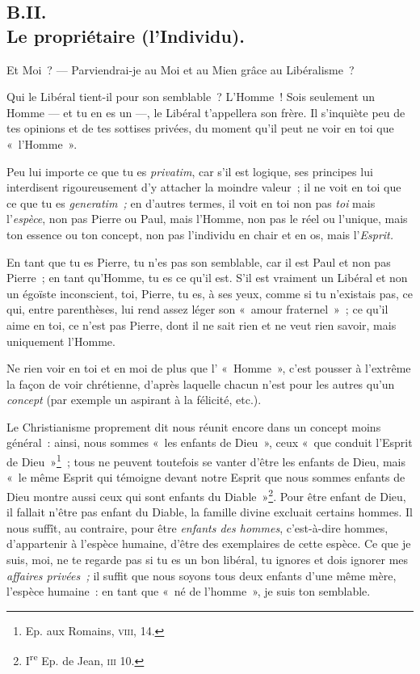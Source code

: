 \documentclass[french,twoside]{book} %
\begin{document}
 \subsection[{B.II. Le propriétaire (l’Individu).}]{B.II. \\
Le propriétaire (l’Individu).}
\noindent Et Moi ? — Parviendrai-je au Moi et au Mien grâce au Libéralisme ?\par
Qui le Libéral tient-il pour son semblable ? L’Homme ! Sois seulement un Homme — et tu en es un —, le Libéral t’appellera son frère. Il s’inquiète peu de tes opinions et de tes sottises privées, du moment qu’il peut ne voir en toi que « l’Homme ».\par
Peu lui importe ce que tu es \emph{privatim}, car s’il est logique, ses principes lui interdisent rigoureusement d’y attacher la moindre valeur ; il ne voit en toi que ce que tu es \emph{generatim ;} en d’autres termes, il voit en toi non pas \emph{toi} mais l’\emph{espèce}, non pas Pierre ou Paul, mais l’Homme, non pas le réel ou l’unique, mais ton essence ou ton concept, non pas l’individu en chair et en os, mais l’\emph{Esprit.}\par
En tant que tu es Pierre, tu n’es pas son semblable, car il est Paul et non pas Pierre ; en tant qu’Homme, tu es ce qu’il est. S’il est vraiment un Libéral et non un égoïste inconscient, toi, Pierre, tu es, à ses yeux, comme si tu n’existais pas, ce qui, entre parenthèses, lui rend assez léger son « amour fraternel » ; ce qu’il aime en toi, ce n’est pas Pierre, dont il ne sait rien et ne veut rien savoir, mais uniquement l’Homme.\par
 Ne rien voir en toi et en moi de plus que l’ « Homme », c’est pousser à l’extrême la façon de voir chrétienne, d’après laquelle chacun n’est pour les autres qu’un \emph{concept} (par exemple un aspirant à la félicité, etc.).\par
Le Christianisme proprement dit nous réunit encore dans un concept moins général : ainsi, nous sommes « les enfants de Dieu », ceux « que conduit l’Esprit de Dieu »\footnote{ \noindent Ep. aux Romains, {\scshape viii}, 14.
 } ; tous ne peuvent toutefois se vanter d’être les enfants de Dieu, mais « le même Esprit qui témoigne devant notre Esprit que nous sommes enfants de Dieu montre aussi ceux qui sont enfants du Diable »\footnote{ \noindent I\textsuperscript{re} Ep. de Jean, {\scshape iii} 10.
 }. Pour être enfant de Dieu, il fallait n’être pas enfant du Diable, la famille divine excluait certains hommes. Il nous suffît, au contraire, pour être \emph{enfants des hommes}, c’est-à-dire hommes, d’appartenir à l’espèce humaine, d’être des exemplaires de cette espèce. Ce que je suis, moi, ne te regarde pas si tu es un bon libéral, tu ignores et dois ignorer mes \emph{affaires privées ;} il suffit que nous soyons tous deux enfants d’une même mère, l’espèce humaine : en tant que « né de l’homme », je suis ton semblable.\par
\end{document}
